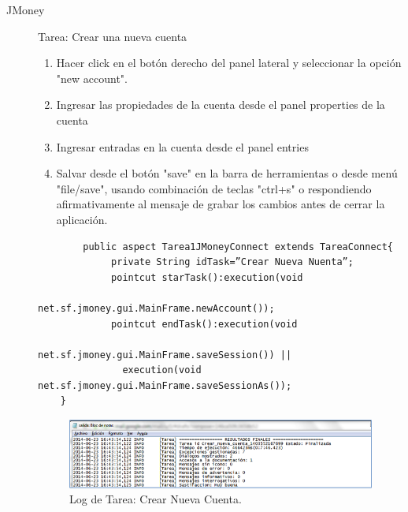 \begin{description}
\item[JMoney]
Tarea: Crear una nueva cuenta

	\begin{enumerate}
		\item Hacer click en el botón derecho del panel lateral y seleccionar la opción "new account".
		\item Ingresar las propiedades de la cuenta desde el panel properties de la cuenta
		\item Ingresar entradas en la cuenta desde el panel entries  
		\item Salvar desde el botón "save" en la barra de herramientas o desde menú "file/save", usando combinación de teclas "ctrl+s" o respondiendo afirmativamente al mensaje de grabar los cambios antes de cerrar la aplicación.
	\end{enumerate}

	\begin{verbatim}
		public aspect Tarea1JMoneyConnect extends TareaConnect{		
		     private String idTask=”Crear Nueva Nuenta”;
		     pointcut starTask():execution(void   
		                  net.sf.jmoney.gui.MainFrame.newAccount());
		     pointcut endTask():execution(void                  
		               net.sf.jmoney.gui.MainFrame.saveSession()) || 
		       execution(void net.sf.jmoney.gui.MainFrame.saveSessionAs());
	}
	\end{verbatim}

	\begin{figure}[ht!]
		\centering
		\includegraphics[scale=1]{figs/fig5.png}
		\caption{\label{fig:fig5} Log de Tarea: Crear Nueva Cuenta.}
	\end{figure}
	
\end{description}